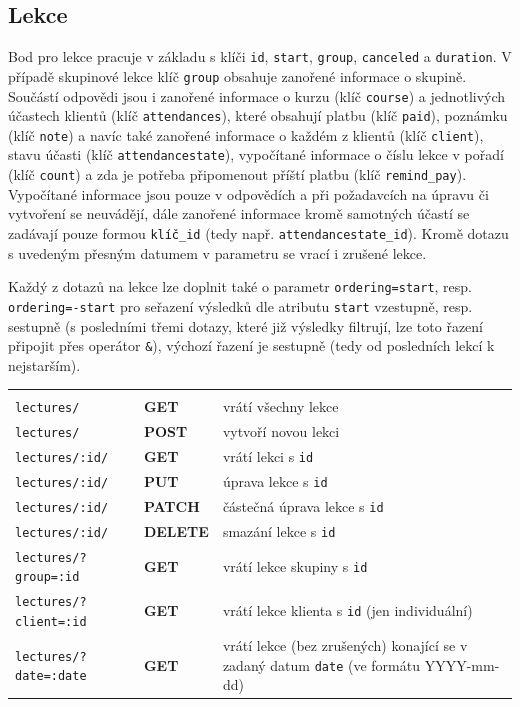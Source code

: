         \subsection{Lekce}
        Bod pro lekce pracuje v základu s klíči \verb|id|, \verb|start|, \verb|group|, \verb|canceled| a \verb|duration|. V případě skupinové lekce klíč \verb|group| obsahuje zanořené informace o skupině. Součástí odpovědi jsou i zanořené informace o kurzu (klíč \verb|course|) a jednotlivých účastech klientů (klíč \verb|attendances|), které obsahují platbu (klíč \verb|paid|), poznámku (klíč \verb|note|) a navíc také zanořené informace o každém z klientů (klíč \verb|client|), stavu účasti (klíč \verb|attendancestate|), vypočítané informace o číslu lekce v pořadí (klíč \verb|count|) a zda je potřeba připomenout příští platbu (klíč \verb|remind_pay|). Vypočítané informace jsou pouze v odpovědích a při požadavcích na úpravu či vytvoření se neuvádějí, dále zanořené informace kromě samotných účastí se zadávají pouze formou \verb|klíč_id| (tedy např. \verb|attendancestate_id|). Kromě dotazu s uvedeným přesným datumem v parametru se vrací i zrušené lekce.
        
        Každý z dotazů na lekce lze doplnit také o parametr \verb|ordering=start|, resp. \verb|ordering=-start| pro seřazení výsledků dle atributu \verb|start| vzestupně, resp. sestupně (s posledními třemi dotazy, které již výsledky filtrují, lze toto řazení připojit přes operátor \verb|&|), výchozí řazení je sestupně (tedy od posledních lekcí k nejstarším).
        
            {\centering
            \begin{tabular}{p{\apiA\textwidth} p{\apiB\textwidth} p{\apiC\textwidth}}&&\\
                \verb|lectures/|            & \textbf{GET}      & vrátí všechny lekce\\
                \verb|lectures/|            & \textbf{POST}     & vytvoří novou lekci\\
                \verb|lectures/:id/|        & \textbf{GET}      & vrátí lekci s \verb|id|\\
                \verb|lectures/:id/|        & \textbf{PUT}      & úprava lekce s \verb|id|\\
                \verb|lectures/:id/|        & \textbf{PATCH}    & částečná úprava lekce s \verb|id|\\
                \verb|lectures/:id/|        & \textbf{DELETE}   & smazání lekce s \verb|id|\\
                \verb|lectures/?group=:id|  & \textbf{GET}      & vrátí lekce skupiny s \verb|id|\\
                \verb|lectures/?client=:id| & \textbf{GET}      & vrátí lekce klienta s \verb|id| (jen individuální)\\
                \verb|lectures/?date=:date| & \textbf{GET}      & vrátí lekce (bez zrušených) konající se v zadaný datum \verb|date| (ve formátu YYYY-mm-dd)\\ %
            \end{tabular}}
        
